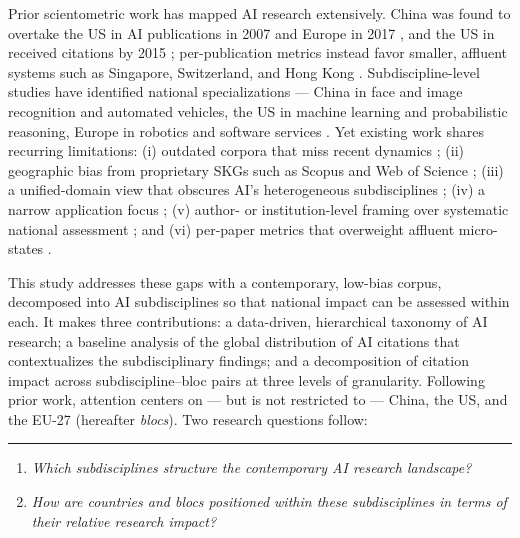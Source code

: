 \documentclass{article}
\let\cite\parencite
\begin{document}
	Prior scientometric work has mapped AI research extensively. China was found to overtake the US in AI publications in 2007 \cite{almarzouqi2024comparative} and Europe in 2017 \cite{hellwig2019ai}, and the US in received citations by 2015 \cite{almarzouqi2024comparative}; per-publication metrics instead favor smaller, affluent systems such as Singapore, Switzerland, and Hong Kong \cite{almarzouqi2024comparative}. Subdiscipline-level studies have identified national specializations --- China in face and image recognition and automated vehicles, the US in machine learning and probabilistic reasoning, Europe in robotics and software services \cite{righi2020ai, yu2023discovering}. Yet existing work shares recurring limitations: (i) outdated corpora that miss recent dynamics \cite{niu2016global}; (ii) geographic bias from proprietary SKGs such as Scopus and Web of Science \cite{almarzouqi2024comparative, ozkaya2023analysis, hellwig2019ai}; (iii) a unified-domain view that obscures AI's heterogeneous subdisciplines \cite{almarzouqi2024comparative, cao2020international, alshebli2022beijing}; (iv) a narrow application focus \cite{schmallenbach2024global, mariani2023artificial}; (v) author- or institution-level framing over systematic national assessment \cite{niu2016global, klinger2020narrowing}; and (vi) per-paper metrics that overweight affluent micro-states \cite{righi2020ai}.
	
	This study addresses these gaps with a contemporary, low-bias corpus, decomposed into AI subdisciplines so that national impact can be assessed within each. It makes three contributions: a data-driven, hierarchical taxonomy of AI research; a baseline analysis of the global distribution of AI citations that contextualizes the subdisciplinary findings; and a decomposition of citation impact across subdiscipline--bloc pairs at three levels of granularity. Following prior work, attention centers on --- but is not restricted to --- China, the US, and the EU-27 (hereafter \textit{blocs}). Two research questions follow:
	
	\vspace{1em}
	\rule{\linewidth}{0.4pt}
	
	\begin{enumerate}
		\item[\textbf{RQ1}]\hspace*{2em}\parbox[t]{\dimexpr\linewidth-2em}{
			\textit{Which subdisciplines structure the contemporary AI research landscape?}
		}
		\vspace{0.5em}
		
		\item[\textbf{RQ2}]\hspace*{2em}\parbox[t]{\dimexpr\linewidth-2em}{
			\textit{How are countries and blocs positioned within these subdisciplines in terms of their relative research impact?}
		}
	\end{enumerate}
	
\end{document}
